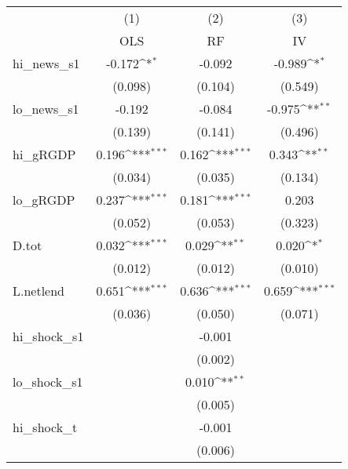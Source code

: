 {
\def\sym#1{\ifmmode^{#1}\else\(^{#1}\)\fi}
\begin{tabular}{l*{3}{c}}
\toprule
            &\multicolumn{1}{c}{(1)}&\multicolumn{1}{c}{(2)}&\multicolumn{1}{c}{(3)}\\
            &\multicolumn{1}{c}{OLS}&\multicolumn{1}{c}{RF}&\multicolumn{1}{c}{IV}\\
\midrule
hi\_news\_s1  &      -0.172\sym{*}  &      -0.092         &      -0.989\sym{*}  \\
            &     (0.098)         &     (0.104)         &     (0.549)         \\
\addlinespace
lo\_news\_s1  &      -0.192         &      -0.084         &      -0.975\sym{**} \\
            &     (0.139)         &     (0.141)         &     (0.496)         \\
\addlinespace
hi\_gRGDP    &       0.196\sym{***}&       0.162\sym{***}&       0.343\sym{**} \\
            &     (0.034)         &     (0.035)         &     (0.134)         \\
\addlinespace
lo\_gRGDP    &       0.237\sym{***}&       0.181\sym{***}&       0.203         \\
            &     (0.052)         &     (0.053)         &     (0.323)         \\
\addlinespace
D.tot       &       0.032\sym{***}&       0.029\sym{**} &       0.020\sym{*}  \\
            &     (0.012)         &     (0.012)         &     (0.010)         \\
\addlinespace
L.netlend   &       0.651\sym{***}&       0.636\sym{***}&       0.659\sym{***}\\
            &     (0.036)         &     (0.050)         &     (0.071)         \\
\addlinespace
hi\_shock\_s1 &                     &      -0.001         &                     \\
            &                     &     (0.002)         &                     \\
\addlinespace
lo\_shock\_s1 &                     &       0.010\sym{**} &                     \\
            &                     &     (0.005)         &                     \\
\addlinespace
hi\_shock\_t  &                     &      -0.001         &                     \\
            &                     &     (0.006)         &                     \\

\end{tabular}}
